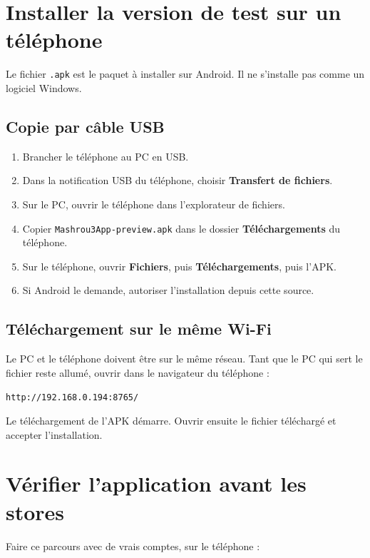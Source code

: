 \documentclass[11pt,a4paper]{article}
\newcommand{\code}[1]{\texttt{#1}}
\begin{document}
\section{Installer la version de test sur un téléphone}

Le fichier \code{.apk} est le paquet à installer sur Android. Il ne s'installe pas comme un logiciel Windows.

\subsection{Copie par câble USB}

\begin{enumerate}
  \item Brancher le téléphone au PC en USB.
  \item Dans la notification USB du téléphone, choisir \textbf{Transfert de fichiers}.
  \item Sur le PC, ouvrir le téléphone dans l'explorateur de fichiers.
  \item Copier \code{Mashrou3App-preview.apk} dans le dossier \textbf{Téléchargements} du téléphone.
  \item Sur le téléphone, ouvrir \textbf{Fichiers}, puis \textbf{Téléchargements}, puis l'APK.
  \item Si Android le demande, autoriser l'installation depuis cette source.
\end{enumerate}

\subsection{Téléchargement sur le même Wi-Fi}

Le PC et le téléphone doivent être sur le même réseau. Tant que le PC qui sert le fichier reste allumé, ouvrir dans le navigateur du téléphone :

\begin{center}
\code{http://192.168.0.194:8765/}
\end{center}

Le téléchargement de l'APK démarre. Ouvrir ensuite le fichier téléchargé et accepter l'installation.

\section{Vérifier l'application avant les stores}

Faire ce parcours avec de vrais comptes, sur le téléphone :
\end{document}
